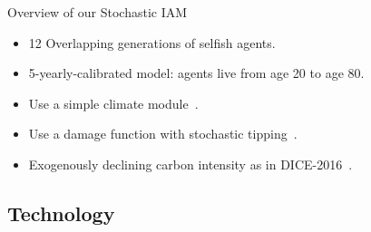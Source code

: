 \documentclass[aspectratio=1610]{beamer}
\begin{document}
\begin{frame}[fragile]{Overview of our Stochastic IAM}

\begin{itemize}
    \item 12 Overlapping generations of selfish agents.
            \vspace{0.5cm}
    \item 5-yearly-calibrated model: agents live from age 20 to age 80.
            \vspace{0.5cm}
    \item Use a simple climate module~\citep{Dietz2020}.
            \vspace{0.5cm}
    \item Use a damage function with stochastic tipping~\citep{kotlikoffParetoimprovingCarbonriskTaxation2021a}.
            \vspace{0.5cm}
    \item Exogenously declining carbon intensity as in DICE-2016~\citep{nordhaus2017revisiting}.
\end{itemize}

\end{frame}


\subsection*{Technology}
\label{sec:firms}
\end{document}
